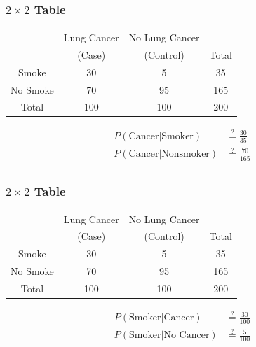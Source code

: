 \documentclass[12pt, 
hyperref={colorlinks=true, linkcolor=blue, urlcolor=cyan}]{beamer}
\begin{document}
\begin{frame}
\frametitle{$2 \times 2$ Table}
\begin{center}
\begin{table}
	\begin{tabular}{|c|cc|c|}
	\hline 
	& Lung Cancer & No Lung Cancer &  \\ 
	& (Case) & (Control) & Total  \\
	\hline 
	Smoke & 30 & 5  & 35 \\ 
	No Smoke & 70 & 95 & 165  \\ 
	\hline 
	Total & 100 & 100 & 200 \\ 
	\hline 
	\end{tabular}
\end{table}
\end{center}
\begin{align*} 
P(\text{Cancer}|\text{Smoker}) &\overset{?}{=} \frac{30}{35} \\ 
P(\text{Cancer}|\text{Nonsmoker}) &\overset{?}{=} \frac{70}{165} \\ 
\end{align*} %
\end{frame}

\begin{frame}
\frametitle{$2 \times 2$ Table}
\begin{center}
\begin{table}
	\begin{tabular}{|c|cc|c|}
	\hline 
	& Lung Cancer & No Lung Cancer &  \\ 
	& (Case) & (Control) & Total  \\
	\hline 
	Smoke & 30 & 5  & 35 \\ 
	No Smoke & 70 & 95 & 165  \\ 
	\hline 
	Total & 100 & 100 & 200 \\ 
	\hline 
	\end{tabular}
\end{table}
\end{center}
\begin{align*} 
P(\text{Smoker}|\text{Cancer}) &\overset{?}{=} \frac{30}{100} \\ 
P(\text{Smoker}|\text{No Cancer}) &\overset{?}{=} \frac{5}{100} \\ 
\end{align*} %
\end{frame}
\end{document}
